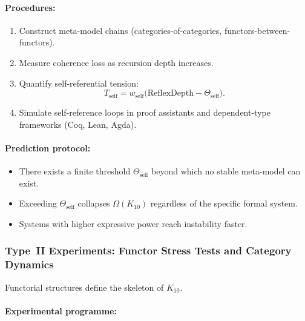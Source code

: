 \paragraph{Procedures:}

\begin{enumerate}
    \item Construct meta-model chains (categories-of-categories,
          functors-between-functors).
    \item Measure coherence loss as recursion depth increases.
    \item Quantify self-referential tension:
          \[
              T_{\mathrm{self}} =
              w_{\mathrm{self}}\bigl(
                 \mathrm{ReflexDepth} - \Theta_{\mathrm{self}}
              \bigr).
          \]
    \item Simulate self-reference loops in proof assistants and
          dependent-type frameworks (Coq, Lean, Agda).
\end{enumerate}

\paragraph{Prediction protocol:}

\begin{itemize}
    \item There exists a finite threshold $\Theta_{\mathrm{self}}$ beyond
          which no stable meta-model can exist.
    \item Exceeding $\Theta_{\mathrm{self}}$ collapses
          $\Omega(K_{10})$ regardless of the specific formal system.
    \item Systems with higher expressive power reach instability faster.
\end{itemize}



\subsubsection{Type~II Experiments: Functor Stress Tests and Category Dynamics}

Functorial structures define the skeleton of $K_{10}$.

\paragraph{Experimental programme:}

